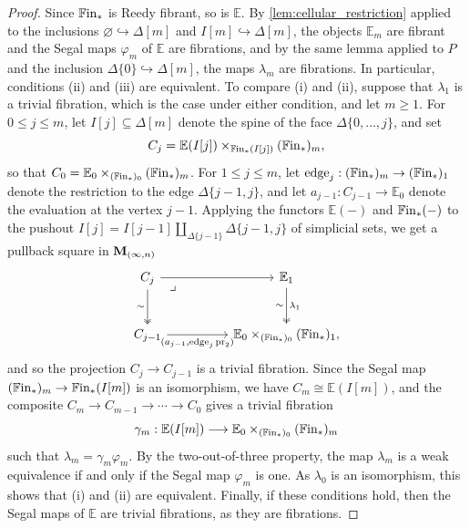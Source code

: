 \documentclass[10pt,reqno]{amsart}
\begin{document}
\begin{proof}
Since $\mathbb{F}\mathrm{in}_*$ is Reedy fibrant, so is $\mathbb E$. By
\cref{lem:cellular_restriction} applied to the inclusions
$\varnothing\hookrightarrow\Delta[m]$ and
$I[m]\hookrightarrow\Delta[m]$, the objects $\mathbb E_m$ are
fibrant and the Segal maps $\varphi_m$ of $\mathbb E$ are
fibrations, and by the same lemma applied to $P$ and the inclusion
$\Delta\{0\}\hookrightarrow\Delta[m]$, the maps $\lambda_m$ are
fibrations. In particular, conditions \textup{(ii)} and \textup{(iii)}
are equivalent. To compare \textup{(i)} and \textup{(ii)}, suppose
that $\lambda_1$ is a trivial fibration, which is the case under
either condition, and let $m\geq1$. For $0\leq j\leq m$, let
$I[j]\subseteq\Delta[m]$ denote the spine of the face
$\Delta\{0,\ldots,j\}$, and set
\[
C_j=
\mathbb E(I[j])
\times_{\mathbb{F}\mathrm{in}_*(I[j])}(\mathbb{F}\mathrm{in}_*)_m,
\]
so that $C_0=\mathbb E_0\times_{(\mathbb{F}\mathrm{in}_*)_0}(\mathbb{F}\mathrm{in}_*)_m$. For
$1\leq j\leq m$, let
$\mathrm{edge}_j:(\mathbb{F}\mathrm{in}_*)_m\to(\mathbb{F}\mathrm{in}_*)_1$ denote the
restriction to the edge $\Delta\{j-1,j\}$, and let
$a_{j-1}:C_{j-1}\to\mathbb E_0$ denote the evaluation at the vertex
$j-1$. Applying the functors $\mathbb E(-)$ and $\mathbb{F}\mathrm{in}_*(-)$ to
the pushout
$I[j]=I[j-1]\amalg_{\Delta\{j-1\}}\Delta\{j-1,j\}$ of simplicial
sets, we get a pullback square in $\mathbf M_{(\infty,n)}$
\[
\begin{tikzcd}[ampersand replacement=\&, row sep=large, column sep=huge]
C_j\arrow[r]\arrow[d,two heads,"\sim"']
  \arrow[dr,phantom,"\lrcorner",very near start]
\&\mathbb E_1\arrow[d,two heads,"\lambda_1","\sim"']\\
C_{j-1}\arrow[r,"{(a_{j-1},\mathrm{edge}_j\pr_2)}"']
\&\mathbb E_0\times_{(\bisimFin)_0}(\bisimFin)_1,
\end{tikzcd}
\]
and so the projection $C_j\to C_{j-1}$ is a trivial fibration. Since
the Segal map $(\mathbb{F}\mathrm{in}_*)_m\to\mathbb{F}\mathrm{in}_*(I[m])$ is an isomorphism, we
have $C_m\cong\mathbb E(I[m])$, and the composite
$C_m\to C_{m-1}\to\cdots\to C_0$ gives a trivial fibration
\[
\gamma_m:\mathbb E(I[m])\longrightarrow
\mathbb E_0\times_{(\mathbb{F}\mathrm{in}_*)_0}(\mathbb{F}\mathrm{in}_*)_m
\]
such that $\lambda_m=\gamma_m\varphi_m$. By the two-out-of-three
property, the map $\lambda_m$ is a weak equivalence if and only if
the Segal map $\varphi_m$ is one. As $\lambda_0$ is an
isomorphism, this shows that \textup{(i)} and \textup{(ii)} are
equivalent. Finally, if these conditions hold, then the Segal maps of
$\mathbb E$ are trivial fibrations, as they are fibrations.
\end{proof}
\end{document}
